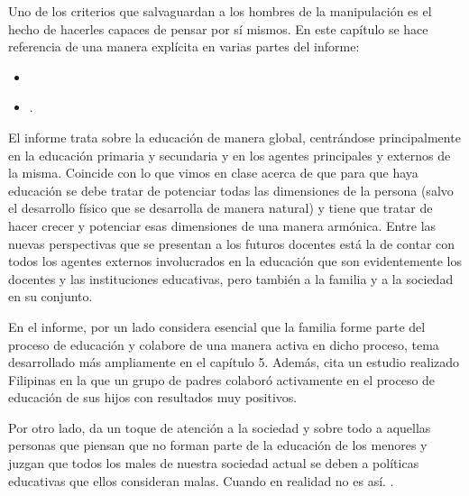 Uno de los criterios que salvaguardan a los hombres de la manipulación es el hecho de hacerles capaces de pensar por sí mismos.
%
En este capítulo se hace referencia de una manera explícita en varias partes del informe:

\begin{itemize}
\item {}
\item {}.
\end{itemize}



El informe trata sobre la educación de manera global, centrándose principalmente en la educación primaria y secundaria y en los agentes principales y externos de la misma.
%
Coincide con lo que vimos en clase acerca de que para que haya educación se debe tratar de potenciar todas las dimensiones de la persona (salvo el desarrollo físico que se desarrolla de manera natural) y tiene que tratar de hacer crecer y potenciar esas dimensiones de una manera armónica.
%
Entre las nuevas perspectivas que se presentan a los futuros docentes está la de contar con todos los agentes externos involucrados en la educación que son evidentemente los docentes y las instituciones educativas, pero también a la familia y a la sociedad en su conjunto.
%

En el informe, por un lado considera esencial que la familia forme parte del proceso de educación y colabore de una manera activa en dicho proceso, tema desarrollado más ampliamente en el capítulo 5.
%
Además, cita un estudio realizado Filipinas en la que un grupo de padres colaboró activamente en el proceso de educación de sus hijos con resultados muy positivos.

Por otro lado, da un toque de atención a la sociedad y sobre todo a aquellas personas que piensan que no forman parte de la educación de los menores y juzgan que todos los males de nuestra sociedad actual se deben a políticas educativas que ellos consideran malas.
%
Cuando en realidad no es así.
%
.

